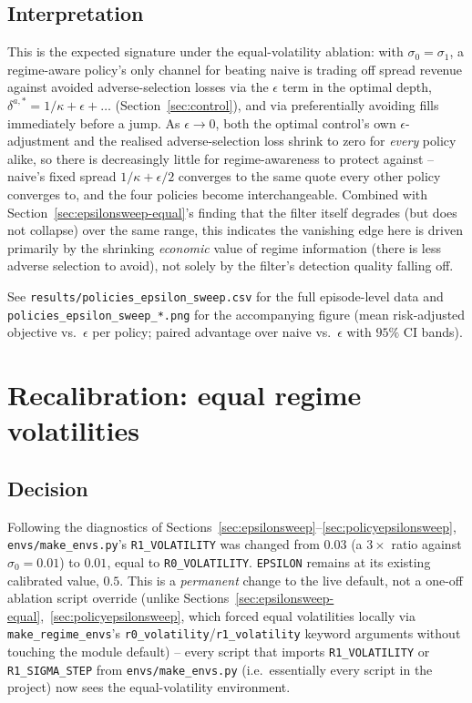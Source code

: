 \documentclass[11pt]{article}
\begin{document}
\subsection{Interpretation}
This is the expected signature under the equal-volatility ablation: with $\sigma_0=\sigma_1$, a regime-aware policy's only channel for beating naive is trading off spread revenue against avoided adverse-selection losses via the $\epsilon$ term in the optimal depth, $\delta^{a,*}=1/\kappa+\epsilon+\ldots$ (Section~\ref{sec:control}), and via preferentially avoiding fills immediately before a jump. As $\epsilon\to0$, both the optimal control's own $\epsilon$-adjustment and the realised adverse-selection loss shrink to zero for \emph{every} policy alike, so there is decreasingly little for regime-awareness to protect against -- naive's fixed spread $1/\kappa+\epsilon/2$ converges to the same quote every other policy converges to, and the four policies become interchangeable. Combined with Section~\ref{sec:epsilonsweep-equal}'s finding that the filter itself degrades (but does not collapse) over the same range, this indicates the vanishing edge here is driven primarily by the shrinking \emph{economic} value of regime information (there is less adverse selection to avoid), not solely by the filter's detection quality falling off.

See \texttt{results/policies\_epsilon\_sweep.csv} for the full episode-level data and \texttt{policies\_epsilon\_sweep\_*.png} for the accompanying figure (mean risk-adjusted objective vs.\ $\epsilon$ per policy; paired advantage over naive vs.\ $\epsilon$ with $95\%$ CI bands).

\section{Recalibration: equal regime volatilities}
\label{sec:equalvolrecal}

\subsection{Decision}
Following the diagnostics of Sections~\ref{sec:epsilonsweep}--\ref{sec:policyepsilonsweep}, \texttt{envs/make\_envs.py}'s \texttt{R1\_VOLATILITY} was changed from $0.03$ (a $3\times$ ratio against $\sigma_0=0.01$) to $0.01$, equal to \texttt{R0\_VOLATILITY}. \texttt{EPSILON} remains at its existing calibrated value, $0.5$. This is a \emph{permanent} change to the live default, not a one-off ablation script override (unlike Sections~\ref{sec:epsilonsweep-equal},~\ref{sec:policyepsilonsweep}, which forced equal volatilities locally via \texttt{make\_regime\_envs}'s \texttt{r0\_volatility}/\texttt{r1\_volatility} keyword arguments without touching the module default) -- every script that imports \texttt{R1\_VOLATILITY} or \texttt{R1\_SIGMA\_STEP} from \texttt{envs/make\_envs.py} (i.e.\ essentially every script in the project) now sees the equal-volatility environment.
\end{document}
